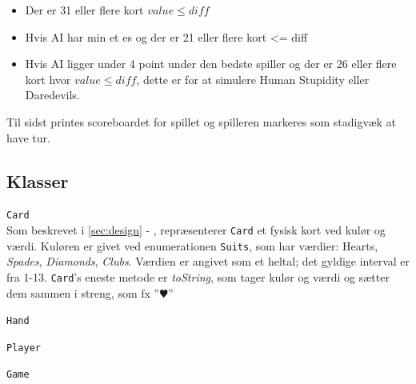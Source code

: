 \documentclass[a4paper]{article}
\newcommand{\namedref}[1]{\autoref{#1} - \nameref{#1}}
\begin{document}
\begin{description}
          \begin{itemize}
            \item Der er 31 eller flere kort $value \leq diff$
            \item Hvis AI har min et es og der er 21 eller flere kort <= diff
            \item Hvis AI ligger under 4 point under den bedste spiller og der er 26 eller flere kort hvor $value \leq diff$,
            dette er for at simulere Human Stupidity eller Daredevils.
          \end{itemize}

          Til sidst printes scoreboardet for spillet og spilleren markeres som stadigvæk at have tur.
      \end{description}
      
    \subsection{Klasser} \label{ssec:classes}
      \begin{description}
        \item{\texttt{\texttt{Card}}}~\\
          Som beskrevet i \namedref{sec:design}, repræsenterer \texttt{Card} et fysisk kort ved 
          kulør og værdi. Kuløren er givet ved enumerationen \texttt{Suits}, som har værdier: 
          Hearts, \textit{Spades}, \textit{Diamonds}, \textit{Clubs}. Værdien er angivet som 
          et heltal; det gyldige interval er fra 1-13.
          \texttt{Card}'s eneste metode er \textit{toString}, som tager kulør og værdi og sætter 
          dem sammen i streng, som fx ”$\varheartsuit$”
          
        \item{\texttt{\texttt{Hand}}}~\\
        \item{\texttt{\texttt{Player}}}~\\
        \item{\texttt{Game}}~\\
      \end{description}
    
\end{document}
